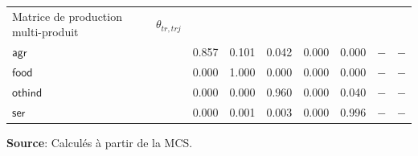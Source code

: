 \documentclass[11pt,a4paper]{article}
\newcommand{\trj}{\mathit{trj}}
\newcommand{\agr}{\mathsf{agr}}
\newcommand{\food}{\mathsf{food}}
\newcommand{\othind}{\mathsf{othind}}
\newcommand{\ser}{\mathsf{ser}}
\newcommand{\tr}{\mathit{tr}}
\begin{document}
\begin{table}[!htbp]
\begin{tabular}{@{}l c D{.}{.}{1.3}D{.}{.}{1.3}D{.}{.}{1.3}D{.}{.}{1.3}D{.}{.}{1.3}D{.}{.}{1.3}D{.}{.}{1.3}@{}}
			\addlinespace
			\quad Matrice de production multi-produit & $\theta_{\tr,\trj}$ \\
			\qquad  $\agr$ & & 0.857 & 0.101 & 0.042& 0.000 & 0.000 &  &  \\
			\qquad  $\food$ & & 0.000 & 1.000 & 0.000& 0.000 & 0.000 &  &  \\
			\qquad  $\othind$ & & 0.000 & 0.000 & 0.960& 0.000 & 0.040 &  &  \\
			\qquad  $\ser$ & & 0.000 & 0.001 & 0.003& 0.000 & 0.996 &  &  \\
			\bottomrule
		\end{tabular}
		
		
		\smallskip
		\Centering
		\small
		\noindent
		\textbf{Source}: Calculés à partir de la MCS.
		
	\end{table}
	
	\vfill
	
\end{document}
